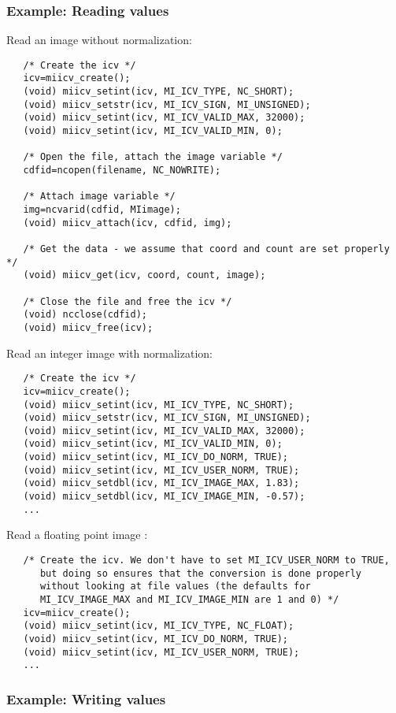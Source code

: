 \subsubsection{Example: Reading values}

Read an image without normalization:
\begin{verbatim}
   /* Create the icv */
   icv=miicv_create();
   (void) miicv_setint(icv, MI_ICV_TYPE, NC_SHORT);
   (void) miicv_setstr(icv, MI_ICV_SIGN, MI_UNSIGNED);
   (void) miicv_setint(icv, MI_ICV_VALID_MAX, 32000);
   (void) miicv_setint(icv, MI_ICV_VALID_MIN, 0);

   /* Open the file, attach the image variable */
   cdfid=ncopen(filename, NC_NOWRITE);

   /* Attach image variable */
   img=ncvarid(cdfid, MIimage);
   (void) miicv_attach(icv, cdfid, img);

   /* Get the data - we assume that coord and count are set properly */
   (void) miicv_get(icv, coord, count, image);

   /* Close the file and free the icv */
   (void) ncclose(cdfid);
   (void) miicv_free(icv);
\end{verbatim}

Read an integer image with normalization:
\begin{verbatim}
   /* Create the icv */
   icv=miicv_create();
   (void) miicv_setint(icv, MI_ICV_TYPE, NC_SHORT);
   (void) miicv_setstr(icv, MI_ICV_SIGN, MI_UNSIGNED);
   (void) miicv_setint(icv, MI_ICV_VALID_MAX, 32000);
   (void) miicv_setint(icv, MI_ICV_VALID_MIN, 0);
   (void) miicv_setint(icv, MI_ICV_DO_NORM, TRUE);
   (void) miicv_setint(icv, MI_ICV_USER_NORM, TRUE);
   (void) miicv_setdbl(icv, MI_ICV_IMAGE_MAX, 1.83);
   (void) miicv_setdbl(icv, MI_ICV_IMAGE_MIN, -0.57);
   ...
\end{verbatim}

Read a floating point image :
\begin{verbatim}
   /* Create the icv. We don't have to set MI_ICV_USER_NORM to TRUE,
      but doing so ensures that the conversion is done properly
      without looking at file values (the defaults for
      MI_ICV_IMAGE_MAX and MI_ICV_IMAGE_MIN are 1 and 0) */
   icv=miicv_create();
   (void) miicv_setint(icv, MI_ICV_TYPE, NC_FLOAT);
   (void) miicv_setint(icv, MI_ICV_DO_NORM, TRUE);
   (void) miicv_setint(icv, MI_ICV_USER_NORM, TRUE);
   ...
\end{verbatim}

\subsubsection{Example: Writing values}

